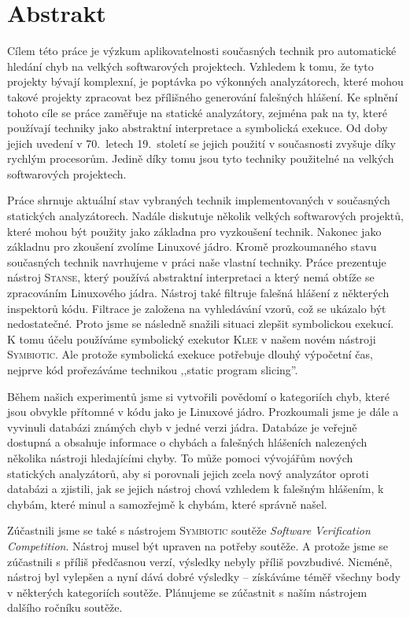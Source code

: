 \documentclass[11pt,a4paper]{article}
\newcommand{\klee}{\textsc{Klee}\xspace}
\newcommand{\stan}{\textsc{Stanse}\xspace}
\newcommand{\symbio}{\textsc{Symbiotic}\xspace}
\begin{document}
\pagestyle{empty}

\section*{Abstrakt}
Cílem této práce je výzkum aplikovatelnosti současných technik pro automatické
hledání chyb na velkých softwarových projektech. Vzhledem k tomu, že tyto
projekty bývají komplexní, je poptávka po výkonných analyzátorech, které mohou
takové projekty zpracovat bez přílišného generování falešných hlášení. Ke
splnění tohoto cíle se práce zaměřuje na statické analyzátory, zejména pak
na ty, které používají techniky jako abstraktní interpretace a symbolická
exekuce.  Od doby jejich uvedení v 70.\ letech 19.\ století se jejich použití
v současnosti zvyšuje díky rychlým procesorům. Jedině díky tomu jsou tyto
techniky použitelné na velkých softwarových projektech.

Práce shrnuje aktuální stav vybraných technik implementovaných v současných
statických analyzátorech. Nadále diskutuje několik velkých softwarových
projektů, které mohou být použity jako základna pro vyzkoušení technik.
Nakonec jako základnu pro zkoušení zvolíme Linuxové jádro. Kromě prozkoumaného
stavu současných technik navrhujeme v práci naše vlastní techniky. Práce
prezentuje nástroj \stan, který používá abstraktní interpretaci a který nemá
obtíže se zpracováním Linuxového jádra.  Nástroj také filtruje falešná hlášení
z některých inspektorů kódu. Filtrace je založena na vyhledávání vzorů, což se
ukázalo být nedostatečné. Proto jsme se následně snažili situaci zlepšit
symbolickou exekucí. K tomu účelu používáme symbolický exekutor \klee v našem
novém nástroji \symbio. Ale protože symbolická exekuce potřebuje dlouhý
výpočetní čas, nejprve kód prořezáváme technikou ,,static program slicing''.

Během našich experimentů jsme si vytvořili povědomí o kategoriích chyb, které
jsou obvykle přítomné v kódu jako je Linuxové jádro. Prozkoumali jsme je dále
a vyvinuli databázi známých chyb v jedné verzi jádra. Databáze je veřejně
dostupná a obsahuje informace o chybách a falešných hlášeních nalezených
několika nástroji hledajícími chyby. To může pomoci vývojářům nových
statických analyzátorů, aby si porovnali jejich zcela nový analyzátor oproti
databázi a zjistili, jak se jejich nástroj chová vzhledem k falešným hlášením,
k chybám, které minul a samozřejmě k chybám, které správně našel.

Zúčastnili jsme se také s nástrojem \symbio soutěže \emph{Software
Verification Competition}. Nástroj musel být upraven na potřeby soutěže. A
protože jsme se zúčastnili s příliš předčasnou verzí, výsledky nebyly příliš
povzbudivé. Nicméně, nástroj byl vylepšen a nyní dává dobré výsledky --
získáváme téměř všechny body v některých kategoriích soutěže. Plánujeme se
zúčastnit s naším nástrojem dalšího ročníku soutěže.
\end{document}
